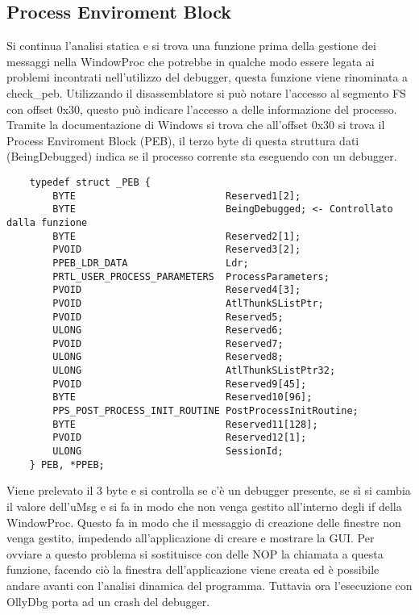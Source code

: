 \documentclass[a4paper,12pt]{article}
\begin{document}
\subsection{Process Enviroment Block}
Si continua l'analisi statica e si trova una funzione prima della gestione dei messaggi nella WindowProc che potrebbe in qualche modo essere legata ai problemi incontrati nell'utilizzo del debugger, questa funzione viene rinominata a check\_peb. Utilizzando il disassemblatore si può notare l'accesso al segmento FS con offset 0x30, questo può indicare l'accesso a delle informazione del processo. Tramite la documentazione di Windows si trova che all'offset 0x30 si trova il Process Enviroment Block (PEB), il terzo byte di questa struttura dati (BeingDebugged) indica se il processo corrente sta eseguendo con un debugger.

\begin{verbatim}
	typedef struct _PEB {
		BYTE                          Reserved1[2];
		BYTE                          BeingDebugged; <- Controllato dalla funzione
		BYTE                          Reserved2[1];
		PVOID                         Reserved3[2];
		PPEB_LDR_DATA                 Ldr;
		PRTL_USER_PROCESS_PARAMETERS  ProcessParameters;
		PVOID                         Reserved4[3];
		PVOID                         AtlThunkSListPtr;
		PVOID                         Reserved5;
		ULONG                         Reserved6;
		PVOID                         Reserved7;
		ULONG                         Reserved8;
		ULONG                         AtlThunkSListPtr32;
		PVOID                         Reserved9[45];
		BYTE                          Reserved10[96];
		PPS_POST_PROCESS_INIT_ROUTINE PostProcessInitRoutine;
		BYTE                          Reserved11[128];
		PVOID                         Reserved12[1];
		ULONG                         SessionId;
	} PEB, *PPEB;
\end{verbatim}

 Viene prelevato il 3 byte e si controlla se c'è un debugger presente, se sì si cambia il valore dell'uMsg e si fa in modo che non venga gestito all'interno degli if della WindowProc. Questo fa in modo che il messaggio di creazione delle finestre non venga gestito, impedendo all'applicazione di creare e mostrare la GUI. Per ovviare a questo problema si sostituisce con delle NOP la chiamata a questa funzione, facendo ciò la finestra dell'applicazione viene creata ed è possibile andare avanti con l'analisi dinamica del programma. Tuttavia ora l'esecuzione con OllyDbg porta ad un crash del debugger.
\end{document}
